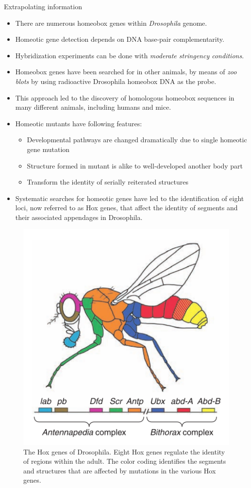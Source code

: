 \documentclass[11pt,dvipsnames,ignorenonframetext,aspectratio=169]{beamer}
\providecommand{\tightlist}{%
  \setlength{\itemsep}{0pt}\setlength{\parskip}{0pt}}
\begin{document}
\begin{frame}{Extrapolating information}
\protect\hypertarget{extrapolating-information}{}

\begin{itemize}
\tightlist
\item
  There are numerous homeobox genes within \emph{Drosophila} genome.
\item
  Homeotic gene detection depends on DNA base-pair complementarity.
\item
  Hybridization experiments can be done with \emph{moderate stringency
  conditions}.
\item
  Homeobox genes have been searched for in other animals, by means of
  \emph{zoo blots} by using radioactive Drosophila homeobox DNA as the
  probe.
\item
  This approach led to the discovery of homologous homeobox sequences in
  many different animals, including humans and mice.
\item
  Homeotic mutants have following features:

  \begin{itemize}
  \tightlist
  \item
    Developmental pathways are changed dramatically due to single
    homeotic gene mutation
  \item
    Structure formed in mutant is alike to well-developed another body
    part
  \item
    Transform the identity of serially reiterated structures
  \end{itemize}
\item
  Systematic searches for homeotic genes have led to the identification
  of eight loci, now referred to as Hox genes, that affect the identity
  of segments and their associated appendages in Drosophila.
\end{itemize}

\end{frame}

\begin{frame}{}
\protect\hypertarget{section-7}{}

\begin{figure}
\includegraphics[width=0.35\linewidth]{./../images/drosophila_hox_genes} \caption{The Hox genes of Drosophila. Eight Hox genes regulate the identity of regions within the adult. The color coding identifies the segments and structures that are affected by mutations in the various Hox genes.}\label{fig:drosophila-hox-genes}
\end{figure}

\end{frame}
\end{document}
